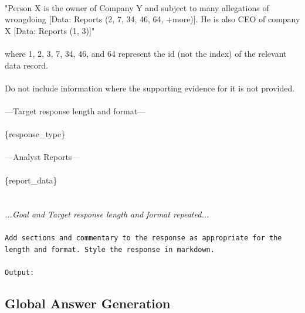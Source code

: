 {\\
"Person X is the owner of Company Y and subject to many allegations of wrongdoing [Data: Reports (2, 7, 34, 46, 64, +more)]. He is also CEO of company X [Data: Reports (1, 3)]"\\
\\
where 1, 2, 3, 7, 34, 46, and 64 represent the id (not the index) of the relevant data record.\\
\\
Do not include information where the supporting evidence for it is not provided.\\
\\
---Target response length and format---\\
\\
\{response\_type\}\\
\\
---Analyst Reports---\\
\\
\{report\_data\}\\
\\}
\textit{\\
...Goal and Target response length and format repeated...\\
\\}
\texttt{Add sections and commentary to the response as appropriate for the length and format. Style the response in markdown.\\
\\
Output:}

\subsection{Global Answer Generation}

